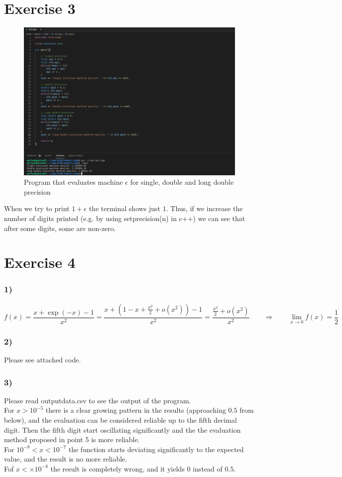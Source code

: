 \documentclass{article}
\begin{document}
\section*{Exercise 3}
\begin{figure}[h]
    \centering 
    \includegraphics[scale=0.35]{pics/machine_eps.png}
    \caption{Program that evaluates machine $\epsilon$ for single, double and long double precision}
    \label{fig:machine_epsilon}
\end{figure}
When we try to print $1+\epsilon$ the terminal shows just $1$. Thus, if we increase the number of digits printed (e.g. by using setprecision(n) in c++) we can see that after some digits, some are non-zero.

\section*{Exercise 4}
\subsubsection*{1)}
\begin{equation*}
    f(x)=\frac{x+\exp (-x)-1}{x^{2}} = \frac{x + \left(1 - x + \frac{x^2}{2} + o(x^2)\right) - 1}{x^2} = \frac{\frac{x^2}{2} + o(x^2)}{x^2} \qquad \Longrightarrow \qquad \lim_{x \to 0} f(x) = \frac{1}{2}
\end{equation*}
\subsubsection*{2)}
Please see attached code.
\subsubsection*{3)}
Please read outputdata.csv to see the output of the program. \\
For $x > 10^{-5}$ there is a clear growing pattern in the results (approaching $0.5$ from below), and the evaluation can be considered reliable up to the fifth decimal digit. Then the fifth digit start oscillating significantly and the the
evaluation method proposed in point 5 is more reliable. \\
For $10^{-8} < x < 10^{-7}$  the function starts deviating significantly to the expected value, and the result is no more reliable. \\
Fof $x < \times 10^{-8}$ the result is completely wrong, and it yields $0$ instead of $0.5$.
\end{document}
